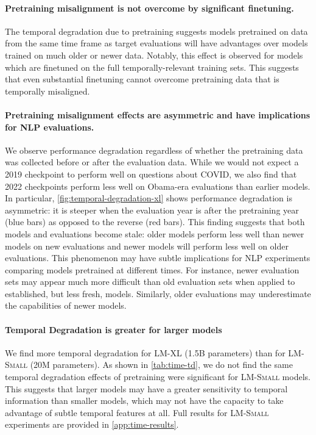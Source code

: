 \documentclass{article}
\newcommand{\smalLM}[0]{\textsc{LM-Small}}
\newcommand{\bigLM}[0]{\textsc{LM-XL}}
\begin{document}


\vspace{-3mm}
\paragraph{Pretraining misalignment is not overcome by significant finetuning.}
The temporal degradation due to pretraining suggests models pretrained on data from the same time frame as target evaluations will have advantages over models trained on much older or newer data.
Notably, this effect is observed for models which are finetuned on the full temporally-relevant training sets.
This suggests that even substantial finetuning cannot overcome pretraining data that is temporally misaligned.

\vspace{-3mm}
\paragraph{Pretraining misalignment effects are asymmetric and have implications for NLP evaluations.}
We observe performance degradation regardless of whether the pretraining data was collected before or after the evaluation data.
While we would not expect a 2019 checkpoint to perform well on questions about COVID, we also find that 2022 checkpoints perform less well on Obama-era evaluations than earlier models.
In particular, \cref{fig:temporal-degradation-xl} shows performance degradation is asymmetric: it is steeper when the evaluation year is after the pretraining year (blue bars) as opposed to the reverse (red bars).
This finding suggests that both models and evaluations become stale: older models perform less well than newer models on new evaluations and newer models will perform less well on older evaluations.
This phenomenon may have subtle implications for NLP experiments comparing models pretrained at different times.
For instance, newer evaluation sets may appear much more difficult than old evaluation sets when applied to established, but less fresh, models.
Similarly, older evaluations may underestimate the capabilities of newer models.

\vspace{-3mm}
\paragraph{Temporal Degradation is greater for larger models}
We find more temporal degradation for \bigLM{} (1.5B parameters) than for \smalLM{} (20M parameters). 
As shown in \cref{tab:time-td}, we do not find the same temporal degradation effects of pretraining were significant for \smalLM{} models.
This suggests that larger models may have a greater sensitivity to temporal information than smaller models, which may not have the capacity to take advantage of subtle temporal features at all.
Full results for \smalLM{} experiments are provided in \cref{app:time-results}.
\end{document}

